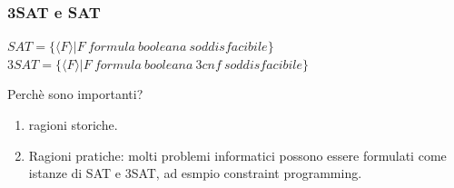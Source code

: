 \documentclass[a4paper, 12pt]{article}
\begin{document}
\subsubsection{3SAT e SAT}
\begin{center}
$SAT = \{\langle F \rangle | F\ formula\ booleana\ soddisfacibile\}$\\
$3SAT = \{\langle F \rangle | F\ formula\ booleana\ 3cnf\ soddisfacibile\}$
\end{center}
Perch\`e sono importanti?\\
\begin{enumerate}
\item ragioni storiche.
\item Ragioni pratiche: molti problemi informatici possono essere formulati come istanze di SAT e 3SAT, ad esmpio constraint programming.
\end{enumerate}
\end{document}

